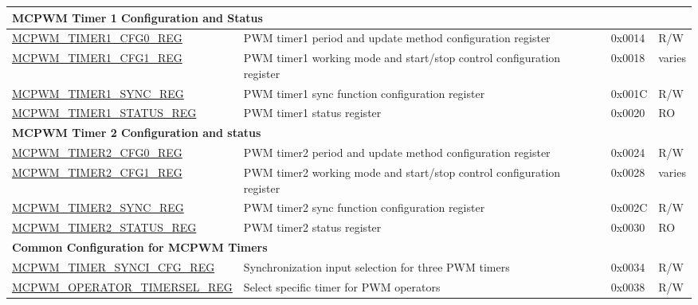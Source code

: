 \begin{longtable}{ | p{6cm} | p{7.2cm} | p{1.3cm} | p{1cm} | }
\multicolumn{4}{|l|}{\textbf{MCPWM Timer 1 Configuration and Status}} \\ \hline
\hyperref[regdesc:MCPWMTIMERNCFG0REG]{MCPWM\_TIMER1\_CFG0\_REG} & PWM timer1 period and update method configuration register & 0x0014 & R/W \\ \hline
\hyperref[regdesc:MCPWMTIMERNCFG1REG]{MCPWM\_TIMER1\_CFG1\_REG} & PWM timer1 working mode and start/stop control configuration register & 0x0018 & varies \\ \hline
\hyperref[regdesc:MCPWMTIMERNSYNCREG]{MCPWM\_TIMER1\_SYNC\_REG} & PWM timer1 sync function configuration register & 0x001C & R/W \\ \hline
\hyperref[regdesc:MCPWMTIMERNSTATUSREG]{MCPWM\_TIMER1\_STATUS\_REG} & PWM timer1 status register & 0x0020 & RO \\ \hline
\multicolumn{4}{|l|}{\textbf{MCPWM Timer 2 Configuration and status}} \\ \hline
\hyperref[regdesc:MCPWMTIMERNCFG0REG]{MCPWM\_TIMER2\_CFG0\_REG} & PWM timer2 period and update method configuration register & 0x0024 & R/W \\ \hline
\hyperref[regdesc:MCPWMTIMERNCFG1REG]{MCPWM\_TIMER2\_CFG1\_REG} & PWM timer2 working mode and start/stop control configuration register & 0x0028 & varies \\ \hline
\hyperref[regdesc:MCPWMTIMERNSYNCREG]{MCPWM\_TIMER2\_SYNC\_REG} & PWM timer2 sync function configuration register & 0x002C & R/W \\ \hline
\hyperref[regdesc:MCPWMTIMERNSTATUSREG]{MCPWM\_TIMER2\_STATUS\_REG} & PWM timer2 status register & 0x0030 & RO \\ \hline
\multicolumn{4}{|l|}{\textbf{Common Configuration for MCPWM Timers}} \\ \hline
\hyperref[regdesc:MCPWMTIMERSYNCICFGREG]{MCPWM\_TIMER\_SYNCI\_CFG\_REG} & Synchronization input selection for three PWM timers & 0x0034 & R/W \\ \hline
\hyperref[regdesc:MCPWMOPERATORTIMERSELREG]{MCPWM\_OPERATOR\_TIMERSEL\_REG} & Select specific timer for PWM operators & 0x0038 & R/W \\ \hline


\end{longtable}
